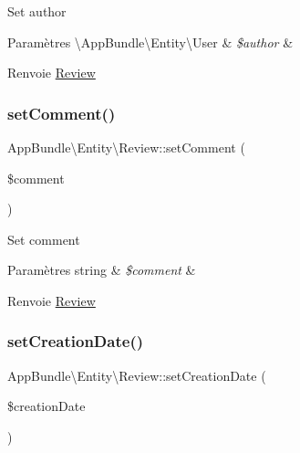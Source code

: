Set author


\begin{DoxyParams}[1]{Paramètres}
\textbackslash{}\+App\+Bundle\textbackslash{}\+Entity\textbackslash{}\+User & {\em \$author} & \\
\hline
\end{DoxyParams}
\begin{DoxyReturn}{Renvoie}
\hyperlink{classAppBundle_1_1Entity_1_1Review}{Review} 
\end{DoxyReturn}
\mbox{\label{classAppBundle_1_1Entity_1_1Review_abb860d7311313005a3d43c7ae4f5028f}} 
\subsubsection{\texorpdfstring{set\+Comment()}{setComment()}}
{\footnotesize\ttfamily App\+Bundle\textbackslash{}\+Entity\textbackslash{}\+Review\+::set\+Comment (\begin{DoxyParamCaption}\item[{}]{\$comment }\end{DoxyParamCaption})}

Set comment


\begin{DoxyParams}[1]{Paramètres}
string & {\em \$comment} & \\
\hline
\end{DoxyParams}
\begin{DoxyReturn}{Renvoie}
\hyperlink{classAppBundle_1_1Entity_1_1Review}{Review} 
\end{DoxyReturn}
\mbox{\label{classAppBundle_1_1Entity_1_1Review_a41be2d79098867b4f7cab2cac880ca5c}} 
\subsubsection{\texorpdfstring{set\+Creation\+Date()}{setCreationDate()}}
{\footnotesize\ttfamily App\+Bundle\textbackslash{}\+Entity\textbackslash{}\+Review\+::set\+Creation\+Date (\begin{DoxyParamCaption}\item[{}]{\$creation\+Date }\end{DoxyParamCaption})}

